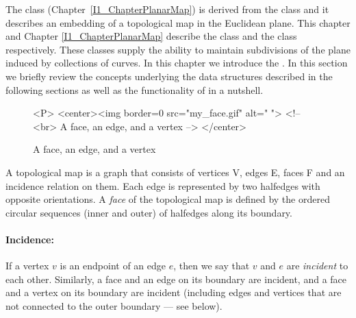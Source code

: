    The  class
   (Chapter~\ref{I1_ChapterPlanarMap}) is derived from the
    class and it describes an embedding of
   a topological map in the Euclidean plane.  This chapter and Chapter
   \ref{I1_ChapterPlanarMap} describe the  class
   and the  class respectively. These classes supply
   the ability to maintain subdivisions of the plane induced by
   collections of curves. In this chapter we introduce the
   . In this section we briefly review the
   concepts underlying the data structures described in the following
   sections as well as the functionality of  in a
   nutshell.

\begin{figure}
\begin{ccTexOnly}
    \centerline{
    }
\end{ccTexOnly}
\caption{A face, an edge, and a vertex \label{fig:face}}

\begin{ccHtmlOnly}
  <P>
  <center><img border=0 src="my_face.gif" alt=" ">
  <!-- <br> A face, an edge, and a vertex -->
  </center>
\end{ccHtmlOnly}

\end{figure}

A topological map is a graph that consists of vertices V,
edges E, faces F and an incidence relation on them. %
Each edge is represented by two halfedges with opposite orientations.
A {\em face} of the topological map is defined by the ordered
circular sequences 
(inner and outer) of halfedges along its boundary. 

\paragraph{Incidence:}
If a vertex $v$ is an endpoint of an edge $e$, then we say that $v$
and $e$ are {\em incident} to each other. Similarly, a face and an
edge on its boundary are incident, and a face and a vertex on its
boundary are incident (including edges and vertices that are not connected 
to the outer boundary --- see below).

